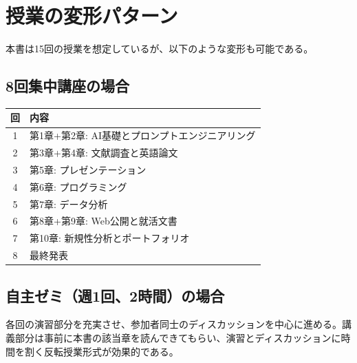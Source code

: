 \section{授業の変形パターン}

本書は15回の授業を想定しているが、以下のような変形も可能である。

\subsection*{8回集中講座の場合}

\begin{table}[H]
\centering
\begin{tabular}{cl}
\toprule
回 & 内容 \\
\midrule
1 & 第1章+第2章: AI基礎とプロンプトエンジニアリング \\
2 & 第3章+第4章: 文献調査と英語論文 \\
3 & 第5章: プレゼンテーション \\
4 & 第6章: プログラミング \\
5 & 第7章: データ分析 \\
6 & 第8章+第9章: Web公開と就活文書 \\
7 & 第10章: 新規性分析とポートフォリオ \\
8 & 最終発表 \\
\bottomrule
\end{tabular}
\end{table}

\subsection*{自主ゼミ（週1回、2時間）の場合}

各回の演習部分を充実させ、参加者同士のディスカッションを中心に進める。講義部分は事前に本書の該当章を読んできてもらい、演習とディスカッションに時間を割く反転授業形式が効果的である。

